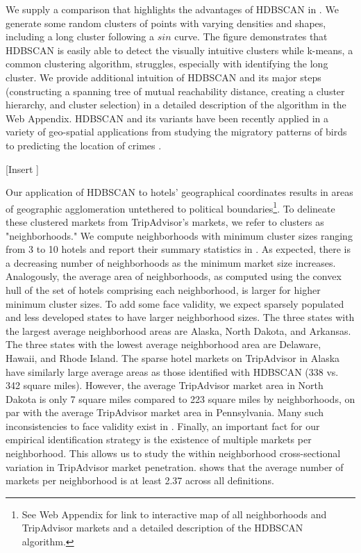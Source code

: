 \documentclass[mksc,blindrev]{informs3} %
\begin{document}
We supply a comparison that highlights the advantages of HDBSCAN in . We generate some random clusters of points with varying densities and shapes, including a long cluster following a $sin$ curve. The figure demonstrates that HDBSCAN is easily able to detect the visually intuitive clusters while k-means, a common clustering algorithm, struggles, especially with identifying the long cluster. We provide additional intuition of HDBSCAN and its major steps (constructing a spanning tree of mutual reachability distance, creating a cluster hierarchy, and cluster selection) in a detailed description of the algorithm in the Web Appendix. HDBSCAN and its variants have been recently applied in a variety of geo-spatial applications from studying the migratory patterns of birds \citep{tang2009discovery} to predicting the location of crimes \citep{bappee2018predicting}. 

[Insert ]

Our application of HDBSCAN to hotels' geographical coordinates results in areas of geographic agglomeration untethered to political boundaries\footnote{See Web Appendix for link to interactive map of all neighborhoods and TripAdvisor markets and a detailed description of the HDBSCAN algorithm.}. To delineate these clustered markets from TripAdvisor's markets, we refer to clusters as "neighborhoods." We compute neighborhoods with minimum cluster sizes ranging from 3 to 10 hotels and report their summary statistics in . As expected, there is a decreasing number of neighborhoods as the minimum market size increases. Analogously, the average area of neighborhoods, as computed using the convex hull of the set of hotels comprising each neighborhood, is larger for higher minimum cluster sizes. To add some face validity, we expect sparsely populated and less developed states to have larger neighborhood sizes. The three states with the largest average neighborhood areas are Alaska, North Dakota, and Arkansas. The three states with the lowest average neighborhood area are Delaware, Hawaii, and Rhode Island. The sparse hotel markets on TripAdvisor in Alaska have similarly large average areas as those identified with HDBSCAN (338 vs. 342 square miles). However, the average TripAdvisor market area in North Dakota is only 7 square miles compared to 223 square miles by neighborhoods, on par with the average TripAdvisor market area in Pennsylvania. Many such inconsistencies to face validity exist in . Finally, an important fact for our empirical identification strategy is the existence of multiple markets per neighborhood. This allows us to study the within neighborhood cross-sectional variation in TripAdvisor market penetration.  shows that the average number of markets per neighborhood is at least 2.37 across all definitions.
\end{document}
